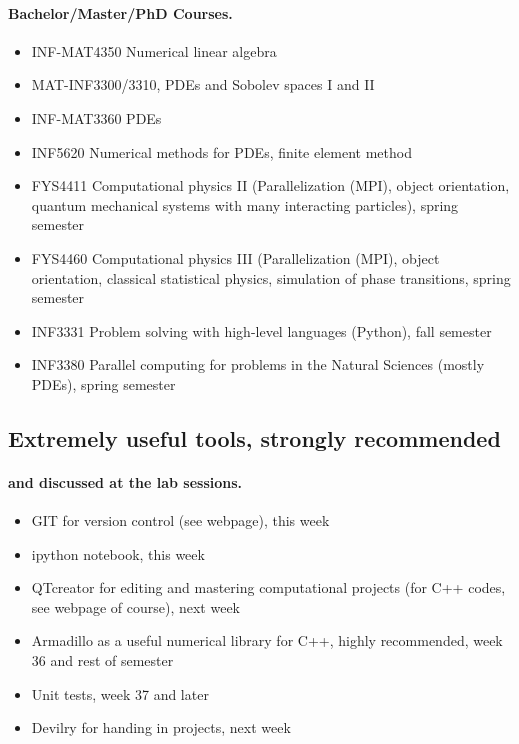 \documentclass[%
oneside,                 %
final,                   %
10pt]{article}
\begin{document}
\paragraph{Bachelor/Master/PhD Courses.}
\begin{itemize}
  \item INF-MAT4350 Numerical linear algebra

  \item MAT-INF3300/3310, PDEs and Sobolev spaces I and II

  \item INF-MAT3360 PDEs

  \item INF5620 Numerical methods for PDEs, finite element method

  \item FYS4411 Computational physics II (Parallelization (MPI), object orientation, quantum mechanical systems with many interacting particles), spring semester

  \item FYS4460 Computational physics III (Parallelization (MPI), object orientation, classical statistical physics, simulation of phase transitions, spring semester

  \item INF3331 Problem solving with high-level languages (Python), fall semester

  \item INF3380 Parallel computing for problems in the Natural Sciences (mostly PDEs), spring semester
\end{itemize}

\noindent




\subsection*{Extremely useful tools, strongly recommended}


\paragraph{and discussed at the lab sessions.}
\begin{itemize}
  \item GIT for version control (see webpage), this week

  \item ipython notebook, this week

  \item QTcreator for editing and mastering computational projects (for C++ codes, see webpage of course), next week

  \item Armadillo as a useful numerical library for C++, highly recommended, week 36 and rest of semester

  \item Unit tests, week 37 and later

  \item Devilry for handing in projects, next week
\end{itemize}

\noindent






\printindex
\end{document}
